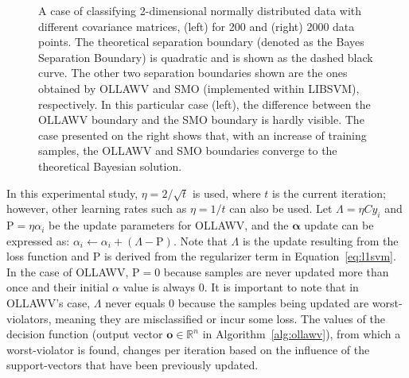 \documentclass[reqno]{vcuthesis}
\newcommand{\reals}{{\mathbb{R}}}
\newcommand{\Rho}{\mathrm{P}}
\numberwithin{equation}{chapter}
\begin{document}
\begin{figure}[t!]
\begin{minipage}{0.49\textwidth}
\end{minipage}
\caption{\small A case of classifying 2-dimensional normally distributed data with different covariance matrices, (left) for 200 and (right) 2000 data points. The theoretical separation boundary (denoted as the Bayes Separation Boundary) is quadratic and is shown as the dashed black curve. The other two separation boundaries shown are the ones obtained by OLLAWV and SMO (implemented within LIBSVM), respectively. In this particular case (left), the difference between the OLLAWV boundary and the SMO boundary is hardly visible. The case presented on the right shows that, with an increase of training samples, the OLLAWV and SMO boundaries converge to the theoretical Bayesian solution.}
\label{fig:ollawvseparation}
\end{figure}

In this experimental study, $\eta = 2/\sqrt{t}$ is used, where $t$ is the current iteration; however, other learning rates such as $\eta = 1/t$ can also be used. Let $\Lambda = \eta Cy_i$ and $\Rho = \eta \alpha_i$ be the update parameters for OLLAWV, and the $\bm \alpha$ update can be expressed as: $\alpha_i \leftarrow \alpha_i + (\Lambda - \Rho)$. Note that $\Lambda$ is the update resulting from the loss function and $\Rho$ is derived from the regularizer term in Equation~\ref{eq:l1svm}. In the case of OLLAWV, $\Rho = 0$ because samples are never updated more than once and their initial $\alpha$ value is always $0$. It is important to note that in OLLAWV's case, $\Lambda$ never equals $0$ because the samples being updated are worst-violators, meaning they are misclassified or incur some loss. The values of the decision function (output vector $\bm o \in \reals^n$ in Algorithm~\ref{alg:ollawv}), from which a worst-violator is found, changes per iteration based on the influence of the support-vectors that have been previously updated. 
\end{document}
